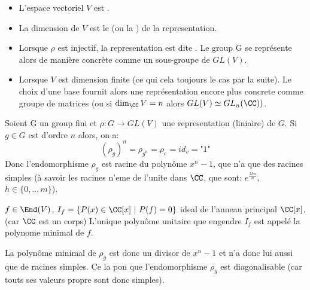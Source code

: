 \begin{definition}[Vocabulaire]	
	\leavevmode
	\begin{itemize}
		\item L'espace vectoriel $V$ est .
		\item La dimension de $V$ est le  (ou la ) de la representation.
		\item Lorsque $\rho$ est injectif, la representation est dite . Le group G se représente alors de manière concrète comme un sous-groupe de $GL(V)$.
		\item Lorsque $V$ est dimension finite (ce qui cela toujours le cas par la suite). Le choix d'une base fournit alors une représentation encore plus concrete comme groupe de matrices (ou si $\dim_\CC V=n$ alors $GL(V)\simeq GL_n(\CC))$.
	\end{itemize}	
\end{definition}


\begin{remark}
	Soient G un group fini et $\rho:G\rightarrow GL(V)$ une representation (liniaire) de $G$.
	Si $g\in G$ est d'ordre $n$ alors, on a:
	$$(\rho_g)^n=\rho_{g^n}=\rho_e=id_v=\text{"1"}$$
	Donc l'endomorphisme $\rho_g$ est racine du polynôme $x^n-1$, que n'a que des racines simples (à savoir les racines n'eme de l'unite dans $\CC$, que sont: $e^{\frac{2h\pi}{n}}$, $h\in\{0,..,m\}$).

	\begin{rappel}	
		$f\in \End (V)$, $I_f=\{P(x)\in\CC[x]\ |\ P(f)=0\}$ ideal de l'anneau principal $\CC[x]$. (car $\CC$ est un corps) L'unique polynôme unitaire que engendre $I_f$ est appelé la polynome minimal de $f$.
	\end{rappel}

	La polynôme minimal de $\rho_g$ est donc un divisor de $x^n-1$ et n'a donc lui aussi que de racines simples. Ce la pon que l'endomorphisme $\rho_g$ est diagonalisable (car touts ses valeurs propre sont donc simples).
\end{remark}

